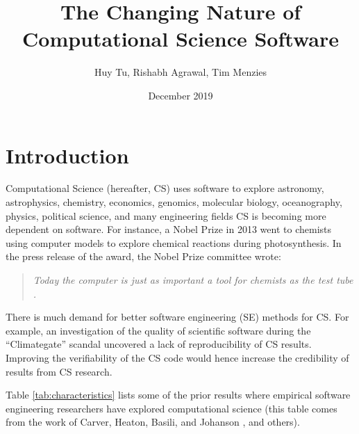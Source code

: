 \documentclass[sigconf,review,anonymous]{acmart}
\title[Changing  Nature of CS Software]{The Changing Nature of Computational Science Software}
\author{Huy Tu, Rishabh Agrawal, Tim Menzies}
\affiliation{ Computer Science, NC State, USA} \email{hqtu@ncsu.edu,  ragrawa3@ncsu.edu, timm@ieee.org}
\date{December 2019}
\newcommand{\bi}{\begin{itemize}}
\newcommand{\ei}{\end{itemize}}
\begin{document}
\maketitle
\section{Introduction}

Computational Science (hereafter, CS)
uses software   to explore
 astronomy, astrophysics, chemistry, economics, genomics, molecular biology, oceanography, physics, political science,  and many   engineering fields 
CS is becoming more dependent on software. For instance, a Nobel Prize in 2013 went to chemists using computer models to explore chemical reactions during photosynthesis. In the press release of the award, the Nobel Prize committee wrote:
\begin{quote}
{\em Today the computer is just as important a tool for chemists as the test tube \cite{nobel_2013}.}
\end{quote}

There is much demand for better software engineering (SE) methods
for CS. For example, an investigation of the 
quality of scientific software during the ``Climategate'' scandal \cite{merali10_error} uncovered a lack of reproducibility of CS results. Improving the verifiability of the CS code would hence increase the credibility of results from CS research.
 




Table \ref{tab:characteristics}
lists some of the prior results
where empirical software
engineering researchers have explored computational science
(this table comes from the work of
Carver, Heaton, Basili, and Johanson \cite{carver13_perception, carver07_environment, basili08_hpc, heaton15_lit, johan18_secs}, and others).
\end{document}
